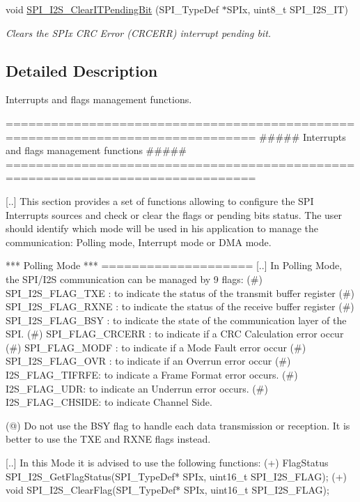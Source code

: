 \begin{DoxyCompactItemize}
void \mbox{\hyperlink{group___s_p_i___group5_ga35a524a49ff3d058137060f751e8749f}{S\+P\+I\+\_\+\+I2\+S\+\_\+\+Clear\+I\+T\+Pending\+Bit}} (S\+P\+I\+\_\+\+Type\+Def $\ast$S\+P\+Ix, uint8\+\_\+t S\+P\+I\+\_\+\+I2\+S\+\_\+\+IT)
\begin{DoxyCompactList}\small\item\em Clears the S\+P\+Ix C\+RC Error (C\+R\+C\+E\+RR) interrupt pending bit. \end{DoxyCompactList}\end{DoxyCompactItemize}


\subsection{Detailed Description}
Interrupts and flags management functions. 

\begin{DoxyVerb} ===============================================================================
            ##### Interrupts and flags management functions #####
 ===============================================================================  
 
 [..] This section provides a set of functions allowing to configure the SPI Interrupts 
      sources and check or clear the flags or pending bits status.
      The user should identify which mode will be used in his application to manage 
      the communication: Polling mode, Interrupt mode or DMA mode. 
    
 *** Polling Mode ***
 ====================
[..] In Polling Mode, the SPI/I2S communication can be managed by 9 flags:
  (#) SPI_I2S_FLAG_TXE : to indicate the status of the transmit buffer register
  (#) SPI_I2S_FLAG_RXNE : to indicate the status of the receive buffer register
  (#) SPI_I2S_FLAG_BSY : to indicate the state of the communication layer of the SPI.
  (#) SPI_FLAG_CRCERR : to indicate if a CRC Calculation error occur              
  (#) SPI_FLAG_MODF : to indicate if a Mode Fault error occur
  (#) SPI_I2S_FLAG_OVR : to indicate if an Overrun error occur
  (#) I2S_FLAG_TIFRFE: to indicate a Frame Format error occurs.
  (#) I2S_FLAG_UDR: to indicate an Underrun error occurs.
  (#) I2S_FLAG_CHSIDE: to indicate Channel Side.

  (@) Do not use the BSY flag to handle each data transmission or reception. It is
      better to use the TXE and RXNE flags instead.

 [..] In this Mode it is advised to use the following functions:
   (+) FlagStatus SPI_I2S_GetFlagStatus(SPI_TypeDef* SPIx, uint16_t SPI_I2S_FLAG);
   (+) void SPI_I2S_ClearFlag(SPI_TypeDef* SPIx, uint16_t SPI_I2S_FLAG);


\end{DoxyVerb}
